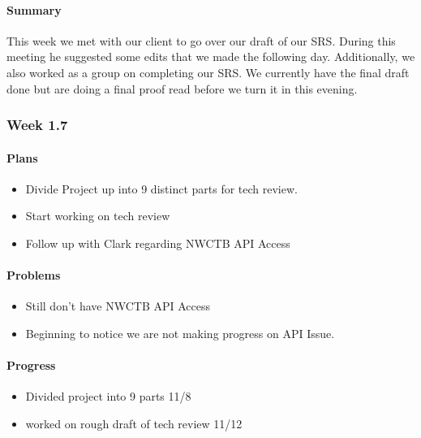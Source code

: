 \documentclass[onecolumn, draftclsnofoot,10pt, compsoc]{article}
\begin{document}
		    \paragraph{Summary} \hfill \break
		        This week we met with our client to go over our draft of our SRS. During this meeting he suggested some edits that we made the following day. Additionally, we also worked as a group on completing our SRS. We currently have the final draft done but are doing a final proof read before we turn it in this evening.\\
		
		\subsubsection{Week 1.7}
		
		    \paragraph{Plans} \hfill \break
		        \begin{itemize}
		            \item Divide Project up into 9 distinct parts for tech review.
		            \item Start working on tech review
		            \item Follow up with Clark regarding NWCTB API Access
		        \end{itemize}
		
		    \paragraph{Problems} \hfill \break
		        \begin{itemize}
		            \item Still don't have NWCTB API Access
		            \item Beginning to notice we are not making progress on API Issue.
		        \end{itemize}
		
		    \paragraph{Progress} \hfill \break
		        \begin{itemize}
		            \item Divided project into 9 parts 11/8
		            \item worked on rough draft of tech review 11/12
		        \end{itemize}
		        
\end{document}

